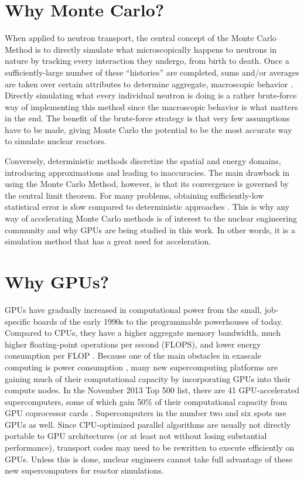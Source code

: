 \section{Why Monte Carlo?}

When applied to neutron transport, the central concept of the Monte Carlo Method is to directly simulate what microscopically happens to neutrons in nature by tracking every interaction they undergo, from birth to death.  Once a sufficiently-large number of these ``histories'' are completed, sums and/or averages are taken over certain attributes to determine aggregate, macroscopic behavior \cite{mcnp}.  Directly simulating what every individual neutron is doing is a rather brute-force way of implementing this method since the macroscopic behavior is what matters in the end.   The benefit of the brute-force strategy is that very few assumptions have to be made, giving Monte Carlo the potential to be the most accurate way to simulate nuclear reactors.  

Conversely, deterministic methods discretize the spatial and energy domains, introducing approximations and leading to inaccuracies.  The main drawback in using the Monte Carlo Method, however, is that its convergence is governed by the central limit theorem. For many problems, obtaining sufficiently-low statistical error is slow compared to deterministic approaches \cite{jaakko,openmc}.  This is why any way of accelerating Monte Carlo methods is of interest to the nuclear engineering community and why GPUs are being studied in this work.  In other words, it is a simulation method that has a great need for acceleration. 

\section{Why GPUs?}

GPUs have gradually increased in computational power from the small, job-specific boards of the early 1990s to the programmable powerhouses of today.  Compared to CPUs, they have a higher aggregate memory bandwidth, much higher floating-point operations per second (FLOPS), and lower energy consumption per FLOP \cite{cuda}.  Because one of the main obstacles in exascale computing is power consumption \cite{exascale}, many new supercomputing platforms are gaining much of their computational capacity by incorporating GPUs into their compute nodes.  In the November 2013 Top 500 list, there are 41 GPU-accelerated supercomputers, some of which gain 50\% of their computational capacity from GPU coprocessor cards \cite{top500}.  Supercomputers in the number two and six spots use GPUs as well.  Since CPU-optimized parallel algorithms are usually not directly portable to GPU architectures (or at least not without losing substantial performance), transport codes may need to be rewritten to execute efficiently on GPUs.  Unless this is done, nuclear engineers cannot take full advantage of these new supercomputers for reactor simulations.

